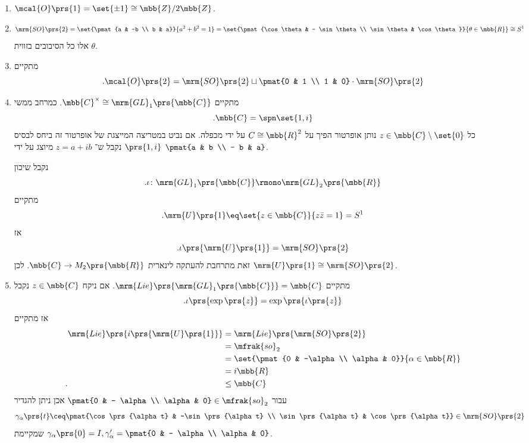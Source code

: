 \documentclass[10pt, twoside]{book}
\begin{document}
\begin{examples*}
\enumthm
\begin{enumerate}
\item $\mcal{O}\prs{1} = \set{\pm 1} \cong \mbb{Z}/2\mbb{Z}$.
\item \[\mrm{SO}\prs{2} = \set{\pmat{a & -b \\ b & a}}{a^2 + b^2 = 1} = \set{\pmat{\cos \theta & - \sin \theta \\ \sin \theta & \cos \theta}}{\theta \in \mbb{R}} \cong S^1\]
אלו כל הסיבובים בזווית
$\theta$.
\item 
מתקיים
\[\text{.}\mcal{O}\prs{2} = \mrm{SO}\prs{2} \sqcup \pmat{0 & 1 \\ 1 & 0} \cdot \mrm{SO}\prs{2}\]
\item מתקיים
$\mbb{C}^\times \cong \mrm{GL}_1\prs{\mbb{C}}$.
כמרחב ממשי
\[\text{.} \mbb{C} = \spn\set{1,i}\]
כל
$z \in \mbb{C} \setminus \set{0}$
נותן אופרטור הפיך על
$C \cong \mbb{R}^2$
על ידי מכפלה. אם נביט במטריצה המייצגת של אופרטור זה ביחס לבסיס
$\prs{1,i}$
נקבל ש־%
$z = a + ib$
מיוצג על ידי
$\pmat{a & b \\ - b & a}$.

נקבל שיכון
\[\text{.} \iota \colon \mrm{GL}_1\prs{\mbb{C}} \rmono \mrm{GL}_2\prs{\mbb{R}}\]
מתקיים
\[\text{.} \mrm{U}\prs{1} \eq \set{z \in \mbb{C}}{z \bar{z} = 1} = S^1\]
אז
\[\text{.} \iota\prs{\mrm{U}\prs{1}} = \mrm{SO}\prs{2}\]
זאת מתרחבת להעתקה לינארית
$\mbb{C} \to M_2\prs{\mbb{R}}$.
לכן
$\mrm{U}\prs{1} \cong \mrm{SO}\prs{2}$.
\item
מתקיים
$\mrm{Lie}\prs{\mrm{GL}_1\prs{\mbb{C}}} = \mbb{C}$.
אם ניקח
$z \in \mbb{C}$
נקבל
\[\text{.} \iota\prs{\exp\prs{z}} = \exp\prs{\iota\prs{z}}\]
אז מתקיים
\begin{align*}
\mrm{Lie}\prs{i\prs{\mrm{U}\prs{1}}} &= \mrm{Lie}\prs{\mrm{SO}\prs{2}}
\\&=
\mfrak{so}_2
\\&=
\set{\pmat{0 & -\alpha \\ \alpha & 0}}{\alpha \in \mbb{R}}
\\&=
i \mbb{R}
\\\text{.}\hphantom{\mrm{Lie}\prs{i\prs{\mrm{U}\prs{1}}}}&\leq
\mbb{C}
\end{align*}
עבור
$\pmat{0 & - \alpha \\ \alpha & 0} \in \mfrak{so}_2$
אכן ניתן להגדיר
\[\gamma_\alpha\prs{t} \ceq \pmat{\cos\prs{\alpha t} & -\sin\prs{\alpha t} \\ \sin\prs{\alpha t} & \cos\prs{\alpha t}} \in \mrm{SO}\prs{2}\]
שמקיימת
$\gamma_\alpha\prs{0} = I, \gamma_{\alpha}'= \pmat{0 & - \alpha \\ \alpha & 0}$.
\end{enumerate}
\end{examples*}
\end{document}
